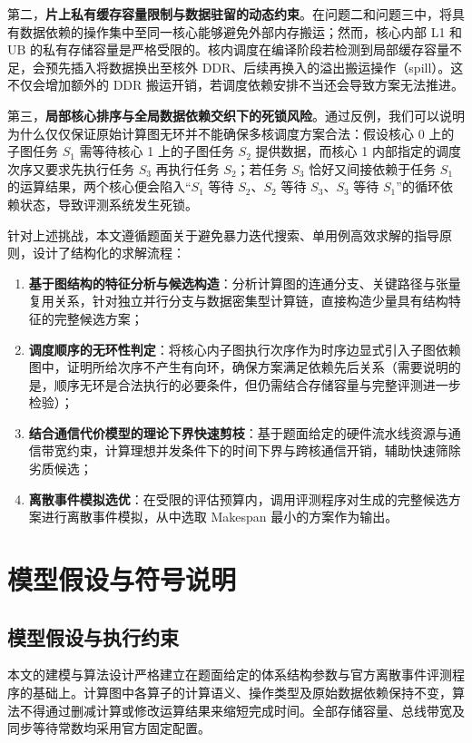 \documentclass[anonymous,withtoc]{gmcm2026}
\providecommand{\tightlist}{\setlength{\itemsep}{0pt}\setlength{\parskip}{0pt}}
\begin{document}
第二，\textbf{片上私有缓存容量限制与数据驻留的动态约束}。在问题二和问题三中，将具有数据依赖的操作集中至同一核心能够避免外部内存搬运；然而，核心内部 L1 和 UB 的私有存储容量是严格受限的。核内调度在编译阶段若检测到局部缓存容量不足，会预先插入将数据换出至核外 DDR、后续再换入的溢出搬运操作（spill）。这不仅会增加额外的 DDR 搬运开销，若调度依赖安排不当还会导致方案无法推进。

第三，\textbf{局部核心排序与全局数据依赖交织下的死锁风险}。通过反例，我们可以说明为什么仅仅保证原始计算图无环并不能确保多核调度方案合法：假设核心 0 上的子图任务 \(S_1\) 需等待核心 1 上的子图任务 \(S_2\) 提供数据，而核心 1 内部指定的调度次序又要求先执行任务 \(S_3\) 再执行任务 \(S_2\)；若任务 \(S_3\) 恰好又间接依赖于任务 \(S_1\) 的运算结果，两个核心便会陷入``\(S_1\) 等待 \(S_2\)、\(S_2\) 等待 \(S_3\)、\(S_3\) 等待 \(S_1\)''的循环依赖状态，导致评测系统发生死锁。

针对上述挑战，本文遵循题面关于避免暴力迭代搜索、单用例高效求解的指导原则，设计了结构化的求解流程：

\begin{enumerate}
\def\labelenumi{\arabic{enumi}.}
\tightlist
\item
  \textbf{基于图结构的特征分析与候选构造}：分析计算图的连通分支、关键路径与张量复用关系，针对独立并行分支与数据密集型计算链，直接构造少量具有结构特征的完整候选方案；
\item
  \textbf{调度顺序的无环性判定}：将核心内子图执行次序作为时序边显式引入子图依赖图中，证明所给次序不产生有向环，确保方案满足依赖先后关系（需要说明的是，顺序无环是合法执行的必要条件，但仍需结合存储容量与完整评测进一步检验）；
\item
  \textbf{结合通信代价模型的理论下界快速剪枝}：基于题面给定的硬件流水线资源与通信带宽约束，计算理想并发条件下的时间下界与跨核通信开销，辅助快速筛除劣质候选；
\item
  \textbf{离散事件模拟选优}：在受限的评估预算内，调用评测程序对生成的完整候选方案进行离散事件模拟，从中选取 Makespan 最小的方案作为输出。
\end{enumerate}


\section{模型假设与符号说明}

\subsection{模型假设与执行约束}

本文的建模与算法设计严格建立在题面给定的体系结构参数与官方离散事件评测程序的基础上。计算图中各算子的计算语义、操作类型及原始数据依赖保持不变，算法不得通过删减计算或修改运算结果来缩短完成时间。全部存储容量、总线带宽及同步等待常数均采用官方固定配置\cite{ref1}。
\end{document}
